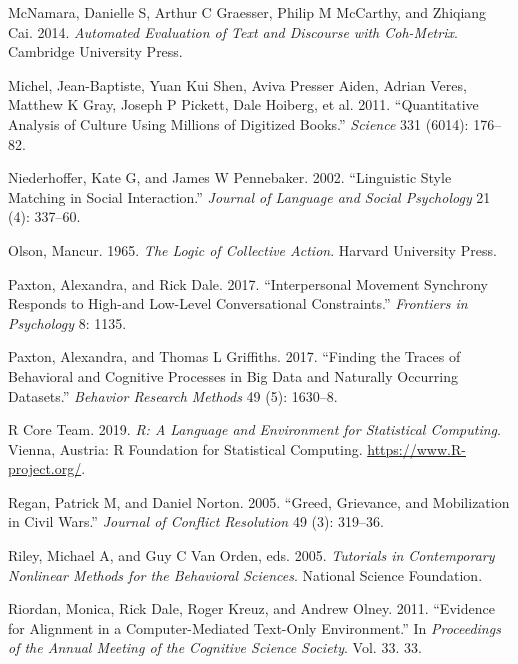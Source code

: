 \documentclass[
  english,
  man]{apa6}
\begin{document}
\leavevmode\hypertarget{ref-mcnamara2014automated}{}%
McNamara, Danielle S, Arthur C Graesser, Philip M McCarthy, and Zhiqiang Cai. 2014. \emph{Automated Evaluation of Text and Discourse with Coh-Metrix}. Cambridge University Press.

\leavevmode\hypertarget{ref-michel2011quantitative}{}%
Michel, Jean-Baptiste, Yuan Kui Shen, Aviva Presser Aiden, Adrian Veres, Matthew K Gray, Joseph P Pickett, Dale Hoiberg, et al. 2011. ``Quantitative Analysis of Culture Using Millions of Digitized Books.'' \emph{Science} 331 (6014): 176--82.

\leavevmode\hypertarget{ref-niederhoffer2002linguistic}{}%
Niederhoffer, Kate G, and James W Pennebaker. 2002. ``Linguistic Style Matching in Social Interaction.'' \emph{Journal of Language and Social Psychology} 21 (4): 337--60.

\leavevmode\hypertarget{ref-olson1965logic}{}%
Olson, Mancur. 1965. \emph{The Logic of Collective Action}. Harvard University Press.

\leavevmode\hypertarget{ref-paxton2017interpersonal}{}%
Paxton, Alexandra, and Rick Dale. 2017. ``Interpersonal Movement Synchrony Responds to High-and Low-Level Conversational Constraints.'' \emph{Frontiers in Psychology} 8: 1135.

\leavevmode\hypertarget{ref-paxton2017finding}{}%
Paxton, Alexandra, and Thomas L Griffiths. 2017. ``Finding the Traces of Behavioral and Cognitive Processes in Big Data and Naturally Occurring Datasets.'' \emph{Behavior Research Methods} 49 (5): 1630--8.

\leavevmode\hypertarget{ref-R-base}{}%
R Core Team. 2019. \emph{R: A Language and Environment for Statistical Computing}. Vienna, Austria: R Foundation for Statistical Computing. \url{https://www.R-project.org/}.

\leavevmode\hypertarget{ref-regan2005greed}{}%
Regan, Patrick M, and Daniel Norton. 2005. ``Greed, Grievance, and Mobilization in Civil Wars.'' \emph{Journal of Conflict Resolution} 49 (3): 319--36.

\leavevmode\hypertarget{ref-riley2005tutorials}{}%
Riley, Michael A, and Guy C Van Orden, eds. 2005. \emph{Tutorials in Contemporary Nonlinear Methods for the Behavioral Sciences}. National Science Foundation.

\leavevmode\hypertarget{ref-riordan2011evidence}{}%
Riordan, Monica, Rick Dale, Roger Kreuz, and Andrew Olney. 2011. ``Evidence for Alignment in a Computer-Mediated Text-Only Environment.'' In \emph{Proceedings of the Annual Meeting of the Cognitive Science Society}. Vol. 33. 33.
\end{document}
